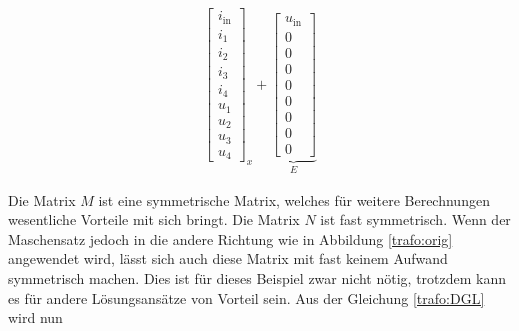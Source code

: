 \begin{refsection}
{\begin{align}
{\begin{bmatrix}
			i_\mathrm{in} \\
			i_1 \\
			i_2 \\
			i_3 \\
			i_4 \\
			u_1 \\
			u_2 \\
			u_3 \\
			u_4
			\end{bmatrix}}_{\text{$x$}}
			+
			\underbrace{\begin{bmatrix}
			u_\mathrm{in} \\
			0 \\
			0 \\
			0 \\
			0 \\
			0 \\
			0 \\
			0 \\
			0
			\end{bmatrix}}_{\text{$E$}}
			\label{trafo:DGL}
\end{align}
}
		


Die Matrix $M$ ist eine symmetrische Matrix, welches für weitere Berechnungen wesentliche Vorteile mit sich bringt. Die Matrix $N$ ist fast symmetrisch. Wenn der Maschensatz jedoch in die andere Richtung wie in Abbildung \ref{trafo:orig} angewendet wird, lässt sich auch diese Matrix mit fast keinem Aufwand symmetrisch machen. Dies ist für dieses Beispiel zwar nicht nötig, trotzdem kann es für andere Lösungsansätze von Vorteil sein. Aus der Gleichung \ref{trafo:DGL} wird nun 


\end{refsection}
